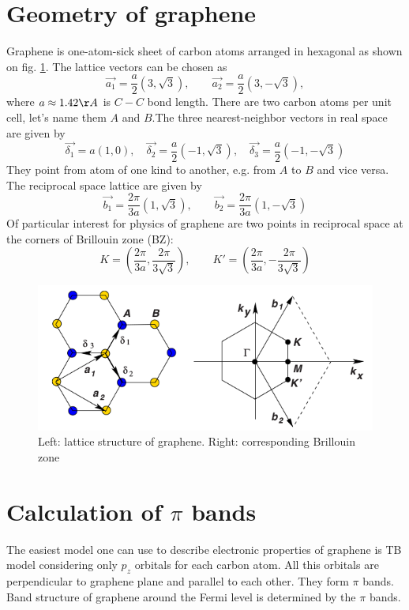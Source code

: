 \section{Geometry of graphene}
Graphene is one-atom-sick sheet of carbon atoms arranged in hexagonal as shown on fig. \ref{fig:graphene_lattice}. The lattice vectors can be chosen as 
\begin{equation}
	\vec{a_1} = \frac{a}{2} (3, \sqrt{3}), \qquad \vec{a_2} = \frac{a}{2} (3, - \sqrt{3}),
\end{equation}
where $a \approx 1.42 \AA$ is $C-C$ bond length. There are two carbon atoms per unit cell, let's name them $A$ and $B$.The three nearest-neighbor vectors in real space are given by 
\begin{equation}
	\vec{\delta_1} = a (1, 0), \quad \vec{\delta_2} = \frac{a}{2} (-1, \sqrt{3}), \quad \vec{\delta_3} = \frac{a}{2} (-1, -\sqrt{3})
\end{equation}
They point from atom of one kind to another, e.g. from $A$ to $B$ and vice versa.
The reciprocal space lattice are given by
\begin{equation}
	\vec{b_1} = \frac{2 \pi}{3 a}(1, \sqrt{3}), \qquad \vec{b_2} = \frac{2 \pi}{3 a} (1, -\sqrt{3})
\end{equation}
Of particular interest for physics of graphene are two points in reciprocal space at the corners of Brillouin zone (BZ):
\begin{equation}
	K = (\frac{2 \pi}{3 a}, \frac{2 \pi}{3 \sqrt{3}}), \qquad K' = (\frac{2 \pi}{3 a}, -\frac{2 \pi}{3 \sqrt{3}})
\end{equation}

\begin{figure}[ht]
\begin{center}
  \includegraphics[width=0.55\linewidth]{img/graphene_lattice}
  \caption{Left: lattice structure of graphene. Right: corresponding Brillouin zone \label{fig:graphene_lattice}}
\end{center}
\end{figure}

\section{Calculation of $\pi$ bands}
\label{sec:graphene_pz}
The easiest model one can use to describe electronic properties of graphene is TB model considering only $p_z$ orbitals for each carbon atom. All this orbitals are perpendicular to graphene plane and parallel to each other. They form $\pi$ bands. Band structure of graphene around the Fermi level is determined by the $\pi$ bands. 

